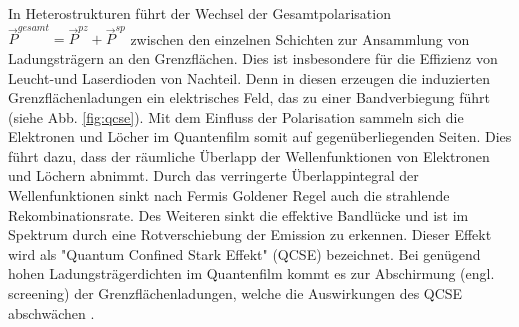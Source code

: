 In Heterostrukturen führt der Wechsel der Gesamtpolarisation $\vec{P}^{gesamt} = \vec{P}^{pz} + \vec{P}^{sp}$ zwischen den einzelnen Schichten zur Ansammlung von Ladungsträgern an den Grenzflächen. Dies ist insbesondere für die Effizienz von Leucht-und Laserdioden von Nachteil. Denn in diesen erzeugen die induzierten Grenzflächenladungen ein elektrisches Feld, das zu einer Bandverbiegung führt (siehe Abb. \ref{fig:qcse}). Mit dem Einfluss der Polarisation sammeln sich die Elektronen und Löcher im Quantenfilm somit auf gegenüberliegenden Seiten. Dies führt dazu, dass der räumliche Überlapp der Wellenfunktionen von Elektronen und Löchern abnimmt. Durch das verringerte Überlappintegral der Wellenfunktionen sinkt nach Fermis Goldener Regel auch die strahlende Rekombinationsrate. Des Weiteren sinkt die effektive Bandlücke und ist im Spektrum durch eine Rotverschiebung der Emission zu erkennen. Dieser Effekt wird als "Quantum Confined Stark Effekt" (QCSE) bezeichnet. Bei genügend hohen Ladungsträgerdichten im Quantenfilm kommt es zur Abschirmung (engl. screening) der Grenzflächenladungen, welche die Auswirkungen des QCSE abschwächen \cite{doi:10.1063/1.2857467} \cite{1347-4065-36-4A-L382}.
